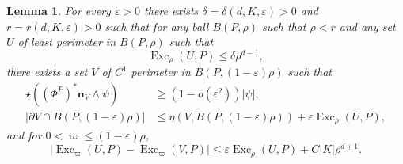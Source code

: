 \documentclass[reqno,10pt]{amsart}
\DeclareMathOperator{\Exc}{Exc}
\newcommand{\normal}{\mathbf n}
\newtheorem{lemma}[theorem]{Lemma}
\theoremstyle{definition}
\numberwithin{equation}{section}
\begin{document}
\begin{lemma}\label{single mollify}
For every $\varepsilon > 0$ there exists $\delta = \delta(d, K, \varepsilon) > 0$ and $r = r(d, K, \varepsilon) > 0$ such that for any ball $B(P, \rho)$ such that $\rho < r$ and any set $U$ of least perimeter in $B(P, \rho)$ such that
$$\Exc_\rho (U, P) \leq \delta \rho^{d - 1},$$
there exists a set $V$ of $C^1$ perimeter in $B(P, (1 - \varepsilon)\rho)$ such that
\begin{align}
\star((\Phi^P)^* \normal_V \wedge \psi) &\geq (1 - o(\varepsilon^2))|\psi|, \label{single mollify normal}\\
|\partial V \cap B(P, (1 - \varepsilon)\rho)| &\leq \eta(V, B(P, (1 - \varepsilon)\rho)) + \varepsilon \Exc_\rho (U, P), \label{single mollify minimality}
\end{align}
and for $0 < \varpi \leq (1 - \varepsilon)\rho$,
\begin{equation}
|\Exc_\varpi (U, P) - \Exc_\varpi (V, P)| \leq \varepsilon \Exc_\rho (U, P) + C|K| \rho^{d + 1}. \label{single mollify excess}
\end{equation}
\end{lemma}
\end{document}
